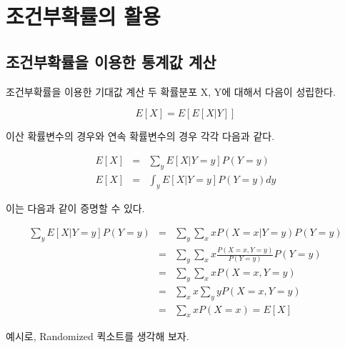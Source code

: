 \documentclass{beamer}
\begin{document}
\section{조건부확률의 활용}
    
\subsection{조건부확률을 이용한 통계값 계산} 

\begin{frame}[allowframebreaks]{조건부확률을 이용한 기대값 계산}
두 확률분포 X, Y에 대해서 다음이 성립한다. 

\begin{equation} 
E[X] = E[E[X|Y]]
\end{equation}

이산 확률변수의 경우와 연속 확률변수의 경우 각각 다음과 같다. 

\begin{eqnarray} 
E[X] &=& \sum_y E[X|Y=y]P(Y=y) \\ 
E[X] &=& \int_y E[X|Y=y]P(Y=y) dy 
\end{eqnarray}


이는 다음과 같이 증명할 수 있다. 

\begin{eqnarray} 
\sum_yE[X|Y=y]P(Y=y) &=& \sum_y \sum_x xP(X=x|Y=y)P(Y=y) \\ 
&=& \sum_y \sum_x x\frac{P(X=x,Y=y)}{P(Y=y)}P(Y=y) \\
&=& \sum_y \sum_x xP(X=x, Y=y)\\
&=& \sum_x x \sum_y yP(X=x,Y=y)\\
&=& \sum_x xP(X=x) = E[X]
\end{eqnarray}

예시로, Randomized 퀵소트를 생각해 보자. 

\end{frame}
\end{document}
